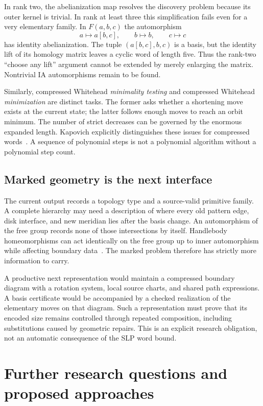 \documentclass[11pt,a4paper]{article}
\theoremstyle{definition}
\theoremstyle{remark}
\begin{document}
In rank two, the abelianization map resolves the discovery problem because
its outer kernel is trivial. In rank at least three this simplification
fails even for a very elementary family. In $F(a,b,c)$ the automorphism
\[
 a\longmapsto a[b,c],\qquad b\longmapsto b,\qquad c\longmapsto c
\]
has identity abelianization. The tuple $(a[b,c],b,c)$ is a basis, but the
identity lift of its homology matrix leaves a cyclic word of length five.
Thus the rank-two ``choose any lift'' argument cannot be extended by merely
enlarging the matrix. Nontrivial IA automorphisms remain to be found.

Similarly, compressed Whitehead \emph{minimality testing} and compressed
Whitehead \emph{minimization} are distinct tasks. The former asks whether a
shortening move exists at the current state; the latter follows enough moves
to reach an orbit minimum. The number of strict decreases can be governed
by the enormous expanded length. Kapovich explicitly distinguishes these
issues for compressed words~\cite{kapovich2026}. A sequence of polynomial
steps is not a polynomial algorithm without a polynomial step count.

\subsection{Marked geometry is the next interface}

The current output records a topology type and a source-valid primitive
family. A complete hierarchy may need a description of where every old
pattern edge, disk interface, and new meridian lies after the basis change.
An automorphism of the free group records none of those intersections by
itself. Handlebody homeomorphisms can act identically on the free group up
to inner automorphism while affecting boundary data~\cite{hensel2021}. The marked problem
therefore has strictly more information to carry.

A productive next representation would maintain a compressed boundary
diagram with a rotation system, local source charts, and shared path
expressions. A basis certificate would be accompanied by a checked
realization of the elementary moves on that diagram. Such a representation
must prove that its encoded size remains controlled through repeated
composition, including substitutions caused by geometric repairs. This is
an explicit research obligation, not an automatic consequence of the SLP
word bound.

\section{Further research questions and proposed approaches}
\label{sec:questions}
\end{document}
